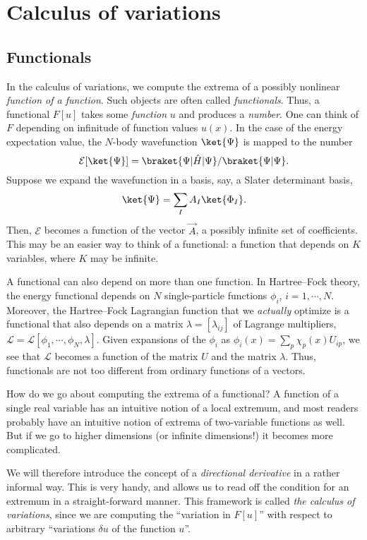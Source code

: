 \section{Calculus of variations}
\label{sec:calculus-of-variations}

\subsection{Functionals}

In the calculus of variations, we compute the extrema of a possibly nonlinear 
\emph{function of a function}. Such objects are often called
\emph{functionals}. Thus, a functional $F[u]$ takes some \emph{function}
$u$ and produces a \emph{number}. One can think of $F$ depending on
infinitude of function values $u(x)$. In the case of the energy expectation
value, the $N$-body wavefunction $\ket{\Psi}$ is mapped to the number
\[ \mathcal{E}[\ket{\Psi}] =
\braket{\Psi|\hat{H}|\Psi}/\braket{\Psi|\Psi}. \] 
Suppose we expand the wavefunction in a basis, say, a Slater
determinant basis,
\[ \ket{\Psi} = \sum_I A_I \ket{\Phi_I}.\]
Then, $\mathcal{E}$ becomes a function of the vector $\vec{A}$, a
possibly infinite set of coefficients. This may be an easier way to
think of a functional: a function that depends on $K$ variables, where
$K$ may be infinite.

A functional can also depend on more than one function. In
Hartree--Fock theory, the energy functional depends on $N$
single-particle functions $\phi_i$, $i=1,\cdots,N$. Moreover, the
Hartree--Fock Lagrangian function that we \emph{actually} optimize is
a functional that also depends on a matrix $\lambda=[\lambda_{ij}]$ of
Lagrange multipliers, $\mathcal{L} =
\mathcal{L}[\phi_1,\cdots,\phi_N,\lambda]$. Given expansions of the
$\phi_i$ as $\phi_i(x) = \sum_p \chi_p(x) U_{ip}$, we see that
$\mathcal{L}$ becomes a function of the matrix $U$ and the matrix
$\lambda$. Thus, functionals are not too different from ordinary
functions of a vectors.

How do we go about computing the extrema of a functional?  A function
of a single real variable has an intuitive notion of a local extremum,
and most readers probably have an intuitive notion of extrema of
two-variable functions as well. But if we go to higher dimensions (or
infinite dimensions!)  it becomes more complicated.

We will therefore introduce the concept of a \emph{directional
  derivative} in a rather informal way. This is very handy, and allows
us to read off the condition for an extremum in a straight-forward
manner. This framework is called \emph{the calculus of variations},
since we are computing the ``variation in $F[u]$'' with respect to
arbitrary ``variations $\delta u$ of the function $u$''.

